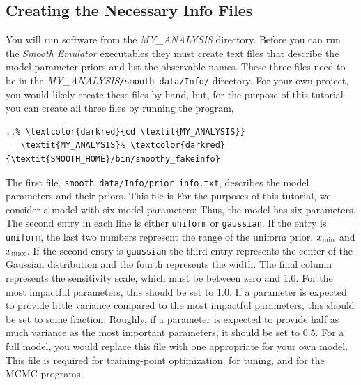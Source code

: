 \documentclass[UserManual.tex]{subfiles}
\begin{document}
\begin{sloppypar}
\subsection{Creating the Necessary Info Files}
You will run software from the \textit{MY\_ANALYSIS} directory. Before you can run the {\it Smooth Emulator} executables they must create text files that describe the model-parameter priors and list the observable names. These three files need to be in the \textit{MY\_ANALYSIS}{\tt /smooth\_data/Info/} directory. For your own project, you would likely create these files by hand, but, for the purpose of this tutorial you can create all three files by running the program,
\vspace*{-8pt}
{\tt \begin{Verbatim}[commandchars=\\\{\}]
   ..% \textcolor{darkred}{cd \textit{MY_ANALYSIS}}
   \textit{MY_ANALYSIS}% \textcolor{darkred}{\textit{SMOOTH_HOME}/bin/smoothy_fakeinfo}
   \end{Verbatim}
}\vspace*{-8pt}

The first file, {\tt smooth\_data/Info/prior\_info.txt}, describes the model parameters and their priors. This file is For the purposes of this tutorial, we consider a model with six model parameters:
\vspace*{-8pt}{\tt \begin{Verbatim}[commandchars=\\\{\}]
# par_name dist_type  xmin/centroid xmax/width  SensitivityScale
   par0 gaussian 0 100    1.00000
   par1 uniform -100 100  1.00000
   par2 gaussian 0 100    1.00000
   par3 uniform -100 100  1.00000
   par4 gaussian 0 100    1.00000
   par5 uniform -100 100  1.00000
\end{Verbatim}
}\vspace*{-8pt}
Thus, the model has six parameters. The second entry in each line is either {\tt uniform} or {\tt gaussian}. If the entry is {\tt uniform}, the last two numbers represent the range of the uniform prior, $x_{\rm min}$ and $x_{\rm max}$. If the second entry is {\tt gaussian} the third entry represents the center of the Gaussian distribution and the fourth represents the width. The final column represents the sensitivity scale, which must be between zero and 1.0. For the most impactful parameters, this should be set to 1.0. If a parameter is expected to provide little variance compared to the most impactful parameters, this should be set to some fraction. Roughly, if a parameter is expected to provide half as much variance as the most important parameters, it should be set to 0.5. For a full model, you would replace this file with one appropriate for your own model. This file is required for training-point optimization, for tuning, and for the MCMC programs.  


\end{sloppypar}
\end{document}
